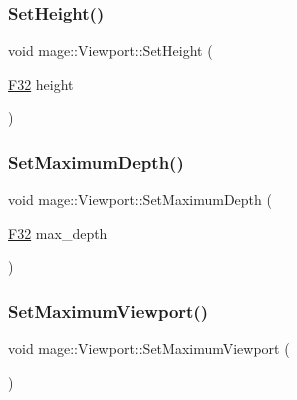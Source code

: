 \hypertarget{classmage_1_1_viewport_a70a89b84a3dbe79475e10b4a61c0a34c}{}\label{classmage_1_1_viewport_a70a89b84a3dbe79475e10b4a61c0a34c} 
\subsubsection{\texorpdfstring{Set\+Height()}{SetHeight()}\hspace{0.1cm}{\footnotesize\ttfamily [2/2]}}
{\footnotesize\ttfamily void mage\+::\+Viewport\+::\+Set\+Height (\begin{DoxyParamCaption}\item[{\hyperlink{namespacemage_aa97e833b45f06d60a0a9c4fc22ae02c0}{F32}}]{height }\end{DoxyParamCaption})\hspace{0.3cm}{\ttfamily [noexcept]}}

\hypertarget{classmage_1_1_viewport_a5f3d52bcaeaa3048d4da86e363131455}{}\label{classmage_1_1_viewport_a5f3d52bcaeaa3048d4da86e363131455} 
\subsubsection{\texorpdfstring{Set\+Maximum\+Depth()}{SetMaximumDepth()}}
{\footnotesize\ttfamily void mage\+::\+Viewport\+::\+Set\+Maximum\+Depth (\begin{DoxyParamCaption}\item[{\hyperlink{namespacemage_aa97e833b45f06d60a0a9c4fc22ae02c0}{F32}}]{max\+\_\+depth }\end{DoxyParamCaption})\hspace{0.3cm}{\ttfamily [noexcept]}}

\hypertarget{classmage_1_1_viewport_a5af006b8ec0464a924c3822265727ee2}{}\label{classmage_1_1_viewport_a5af006b8ec0464a924c3822265727ee2} 
\subsubsection{\texorpdfstring{Set\+Maximum\+Viewport()}{SetMaximumViewport()}}
{\footnotesize\ttfamily void mage\+::\+Viewport\+::\+Set\+Maximum\+Viewport (\begin{DoxyParamCaption}{ }\end{DoxyParamCaption})\hspace{0.3cm}{\ttfamily [noexcept]}}

